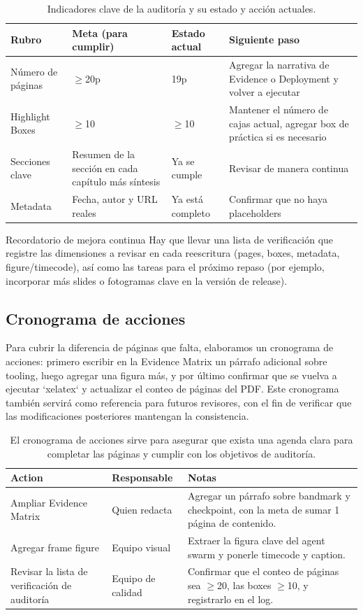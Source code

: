 \begin{table}[H]
\footnotesize
\centering
\begin{tabular}{p{3cm}p{3cm}p{3cm}p{3cm}}
\toprule
Rubro & Meta (para cumplir) & Estado actual & Siguiente paso \\
\midrule
Número de páginas & $\geq$20p & 19p & Agregar la narrativa de Evidence o Deployment y volver a ejecutar \\
Highlight Boxes & $\geq$10 & $\geq$10 & Mantener el número de cajas actual, agregar box de práctica si es necesario \\
Secciones clave & Resumen de la sección en cada capítulo más síntesis & Ya se cumple & Revisar de manera continua \\
Metadata & Fecha, autor y URL reales & Ya está completo & Confirmar que no haya placeholders \\
\bottomrule
\end{tabular}
\caption{Indicadores clave de la auditoría y su estado y acción actuales.}
\end{table}

\begin{importantbox}{Recordatorio de mejora continua}
Hay que llevar una lista de verificación que registre las dimensiones a revisar en cada reescritura (pages, boxes, metadata, figure/timecode), así como las tareas para el próximo repaso (por ejemplo, incorporar más slides o fotogramas clave en la versión de release).
\end{importantbox}

\subsection{Cronograma de acciones}
Para cubrir la diferencia de páginas que falta, elaboramos un cronograma de acciones: primero escribir en la Evidence Matrix un párrafo adicional sobre tooling, luego agregar una figura más, y por último confirmar que se vuelva a ejecutar `xelatex` y actualizar el conteo de páginas del PDF. Este cronograma también servirá como referencia para futuros revisores, con el fin de verificar que las modificaciones posteriores mantengan la consistencia.

\begin{table}[H]
\footnotesize
\centering
\begin{tabular}{p{3cm}p{4cm}p{5cm}}
\toprule
Action & Responsable & Notas \\
\midrule
Ampliar Evidence Matrix & Quien redacta & Agregar un párrafo sobre bandmark y checkpoint, con la meta de sumar 1 página de contenido. \\
Agregar frame figure & Equipo visual & Extraer la figura clave del agent swarm y ponerle timecode y caption. \\
Revisar la lista de verificación de auditoría & Equipo de calidad & Confirmar que el conteo de páginas sea $\geq$20, las boxes $\geq$10, y registrarlo en el log. \\
\bottomrule
\end{tabular}
\caption{El cronograma de acciones sirve para asegurar que exista una agenda clara para completar las páginas y cumplir con los objetivos de auditoría.}
\end{table}

